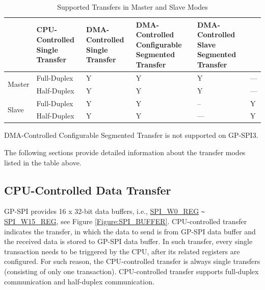 \documentclass[main\_\_EN.tex]{subfiles}
\begin{document}
\begin{table}[H]
    \centering
    \caption{Supported Transfers in Master and Slave Modes}
    \label{tab:transfer-modes}
    \begin{threeparttable}
    \begin{tabular}{|l|l|p{2.5cm}<{\centering}|p{2.5cm}<{\centering}|p{3.3cm}<{\centering}|p{3.3cm}<{\centering}| }
    \hline
        \rowcolor{lightgray}
        \multicolumn{2}{l|}{\textbf{Mode}}  & \textbf{CPU-Controlled Single Transfer}  & \textbf{DMA-Controlled Single Transfer} &   \textbf{DMA-Controlled Configurable Segmented Transfer\tnote{*}}    & \textbf{DMA-Controlled Slave Segmented Transfer} \\\hline
    \multirow{2}{*}{Master} & Full-Duplex & Y & Y & Y & ---\\\cline{2-6}

    & Half-Duplex & Y & Y & Y & ---\\\hline

    \multirow{2}{*}{Slave} & Full-Duplex & Y & Y & -- &Y \\\cline{2-6}
    & Half-Duplex & Y & Y & --- &Y \\\hline
        \end{tabular}
        \begin{tablenotes}
            \item[*] DMA-Controlled Configurable Segmented Transfer is not supported on GP-SPI3.
        \end{tablenotes}
     \end{threeparttable}
    \end{table}
The following sections provide detailed information about the transfer modes listed in the table above.

\subsection{CPU-Controlled Data Transfer}\label{sec:cpu-controlled-data-transfer}
GP-SPI provides 16 x 32-bit data buffers, i.e., \hyperref[regdesc:SPIW0REG]{SPI\_W0\_REG} \verb+~+ \hyperref[regdesc:SPIW15REG]{SPI\_W15\_REG}, see Figure \ref{Figure:SPI_BUFFER}.
CPU-controlled transfer indicates the transfer, in which the data to send is from GP-SPI data buffer and the received data is stored to GP-SPI data buffer.
In such transfer, every single transaction needs to be triggered by the CPU, after its related registers are configured. For such reason, the CPU-controlled transfer is always single transfers (consisting of only one transaction). CPU-controlled transfer supports full-duplex communication and half-duplex communication.
\end{document}
